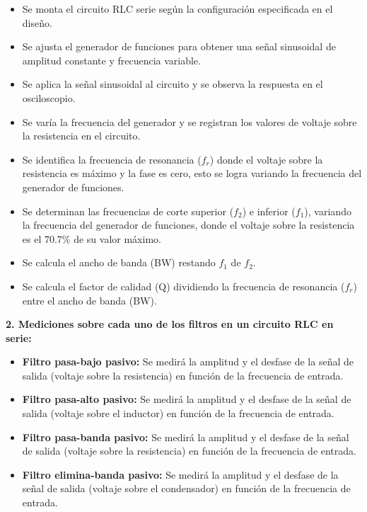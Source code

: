 \documentclass[12pt]{article}
\begin{document}
    \begin{itemize}
        \item Se monta el circuito RLC serie según la configuración especificada en el diseño.
        \item Se ajusta el generador de funciones para obtener una señal sinusoidal de amplitud constante y frecuencia variable.
        \item Se aplica la señal sinusoidal al circuito y se observa la respuesta en el osciloscopio.
        \item Se varía la frecuencia del generador y se registran los valores de voltaje sobre la resistencia en el circuito.
        \item Se identifica la frecuencia de resonancia ($f_{r}$) donde el voltaje sobre la resistencia es máximo y la fase es cero, esto se logra variando la frecuencia del generador de funciones.
        \item Se determinan las frecuencias de corte superior ($f_{2}$) e inferior ($f_{1}$), variando la frecuencia del generador de funciones, donde el voltaje sobre la resistencia es el 70.7\% de su valor máximo.
        \item Se calcula el ancho de banda (BW) restando $f_{1}$ de $f_{2}$.
        \item Se calcula el factor de calidad (Q) dividiendo la frecuencia de resonancia ($f_{r}$) entre el ancho de banda (BW).
    \end{itemize}
    
    \textbf{2. Mediciones sobre cada uno de los filtros en un circuito RLC en serie:}

    \begin{itemize}
        \item \textbf{Filtro pasa-bajo pasivo:} Se medirá la amplitud y el desfase de la señal de salida (voltaje sobre la resistencia) en función de la frecuencia de entrada.
        \item \textbf{Filtro pasa-alto pasivo:} Se medirá la amplitud y el desfase de la señal de salida (voltaje sobre el inductor) en función de la frecuencia de entrada.
        \item \textbf{Filtro pasa-banda pasivo:} Se medirá la amplitud y el desfase de la señal de salida (voltaje sobre la resistencia) en función de la frecuencia de entrada.
        \item \textbf{Filtro elimina-banda pasivo:} Se medirá la amplitud y el desfase de la señal de salida (voltaje sobre el condensador) en función de la frecuencia de entrada.
    \end{itemize}
    
\end{document}
